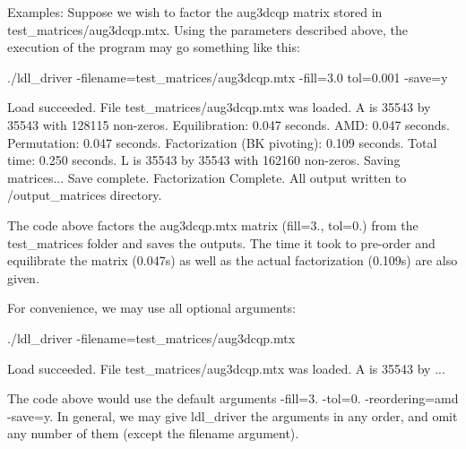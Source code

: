 \begin{DoxyParagraph}{Examples\+:}
Suppose we wish to factor the {\ttfamily aug3dcqp} matrix stored in {\ttfamily test\+\_\+matrices/aug3dcqp.\+mtx}. Using the parameters described above, the execution of the program may go something like this\+: 
\begin{DoxyCode}
./ldl\_driver -filename=test\_matrices/aug3dcqp.mtx -fill=3.0 tol=0.001 -save=y

Load succeeded. File test\_matrices/aug3dcqp.mtx was loaded.
A is 35543 by 35543 with 128115 non-zeros.
  Equilibration:                0.047 seconds.
  AMD:                          0.047 seconds.
  Permutation:                  0.047 seconds.
  Factorization (BK pivoting):  0.109 seconds.
Total time:     0.250 seconds.
L is 35543 by 35543 with 162160 non-zeros.
Saving matrices...
Save complete.
Factorization Complete. All output written to /output\_matrices directory.
\end{DoxyCode}
 The code above factors the {\ttfamily aug3dcqp.\+mtx} matrix ({\ttfamily fill=3., tol=0.}) from the {\ttfamily test\+\_\+matrices} folder and saves the outputs. The time it took to pre-\/order and equilibrate the matrix (0.\+047s) as well as the actual factorization (0.\+109s) are also given.
\end{DoxyParagraph}
\begin{DoxyParagraph}{}
For convenience, we may use all optional arguments\+: 
\begin{DoxyCode}
./ldl\_driver -filename=test\_matrices/aug3dcqp.mtx

Load succeeded. File test\_matrices/aug3dcqp.mtx was loaded.
A is 35543 by ...
\end{DoxyCode}
 The code above would use the default arguments {\ttfamily -\/fill=3. -\/tol=0. -\/reordering=amd -\/save=y}. In general, we may give {\ttfamily ldl\+\_\+driver} the arguments in any order, and omit any number of them (except the {\ttfamily filename} argument).
\end{DoxyParagraph}
